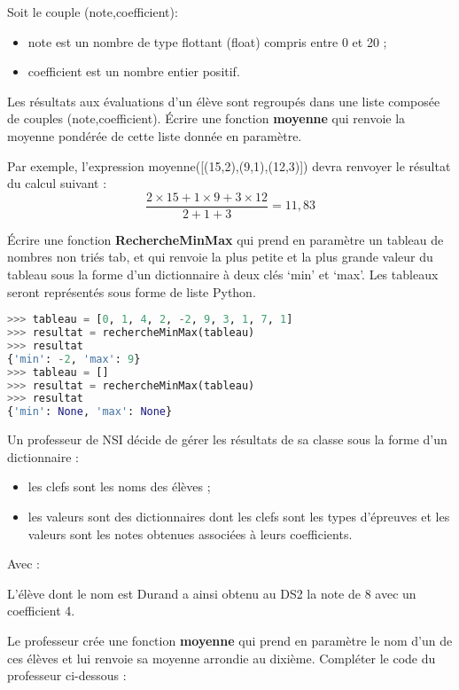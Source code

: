 \documentclass[a4paper,11pt]{article}
\begin{document}
\begin{exo}
    Soit le couple (note,coefficient):
    \begin{itemize}
        \item note est un nombre de type flottant (float) compris entre 0 et 20 ;
        \item coefficient est un nombre entier positif.
    \end{itemize}
    Les résultats aux évaluations d'un élève sont regroupés dans une liste composée de couples (note,coefficient).
    Écrire une fonction \textbf{moyenne} qui renvoie la moyenne pondérée de cette liste donnée en
    paramètre.

    Par exemple, l’expression moyenne([(15,2),(9,1),(12,3)]) devra renvoyer le
    résultat du calcul suivant :
    $$\dfrac{2 × 15 + 1 × 9 + 3 × 12}{2+1+3} = 11,83$$
\end{exo}
\begin{exo}
    Écrire une fonction \textbf{RechercheMinMax} qui prend en paramètre un tableau de nombres
    non triés tab, et qui renvoie la plus petite et la plus grande valeur du tableau sous la
    forme d’un dictionnaire à deux clés ‘min’ et ‘max’. Les tableaux seront représentés sous
    forme de liste Python.

    \begin{center}
        \begin{lstlisting}[language=Python]
>>> tableau = [0, 1, 4, 2, -2, 9, 3, 1, 7, 1]
>>> resultat = rechercheMinMax(tableau)
>>> resultat
{'min': -2, 'max': 9}
>>> tableau = []
>>> resultat = rechercheMinMax(tableau)
>>> resultat
{'min': None, 'max': None}
    \end{lstlisting}
        \label{CODE}
    \end{center}

\end{exo}
\begin{exo}
    Un professeur de NSI décide de gérer les résultats de sa classe sous la forme d’un
    dictionnaire :
    \begin{itemize}
        \item les clefs sont les noms des élèves ;
        \item les valeurs sont des dictionnaires dont les clefs sont les types d’épreuves et les
        valeurs sont les notes obtenues associées à leurs coefficients.
    \end{itemize}
    Avec :


L’élève dont le nom est Durand a ainsi obtenu au DS2 la note de 8 avec un coefficient 4.

Le professeur crée une fonction \textbf{moyenne} qui prend en paramètre le nom d’un de ces élèves et lui renvoie sa moyenne arrondie au dixième.
Compléter le code du professeur ci-dessous :

\end{exo}
\end{document}
